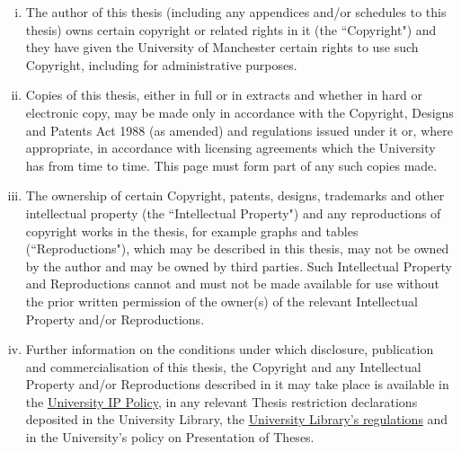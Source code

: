 \begin{enumerate}[i.]
  \item The author of this thesis (including any appendices and/or schedules to this thesis) owns certain copyright or related rights in it (the ``Copyright") and they have given the University of Manchester certain rights to use such Copyright, including for administrative purposes.
  \item Copies of this thesis, either in full or in extracts and whether in hard or electronic copy, may be made only in accordance with the Copyright, Designs and Patents Act 1988 (as amended) and regulations issued under it or, where appropriate, in accordance with licensing agreements which the University has from time to time. This page must form part of any such copies made.
  \item The ownership of certain Copyright, patents, designs, trademarks and other intellectual property (the ``Intellectual Property") and any reproductions of copyright works in the thesis, for example graphs and tables (``Reproductions"), which may be described in this thesis, may not be owned by the author and may be owned by third parties. Such Intellectual Property and Reproductions cannot and must not be made available for use without the prior written permission of the owner(s) of the relevant Intellectual Property and/or Reproductions.
  \item Further information on the conditions under which disclosure, publication and commercialisation of this thesis, the Copyright and any Intellectual Property and/or Reproductions described in it may take place is available in the \href{https://documents.manchester.ac.uk/DocuInfo.aspx?DocID=24420}{University IP Policy}, in any relevant Thesis restriction declarations deposited in the University Library, the \href{https://www.library.manchester.ac.uk/about/regulations/}{University Library’s regulations} and in the University’s policy on Presentation of Theses.
\end{enumerate}
